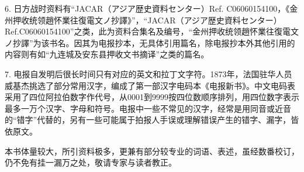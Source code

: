 \documentclass[12pt,UTF8]{ctexbook}
\begin{document}
6. 日方战时资料有“JACAR（アジア歴史資料センター）Ref. C06060154100，《金州押收统领趙怀業往復電文ノ抄譯》”，“JACAR（アジア歴史資料センター）Ref.C06060154100”之类，此为资料合集名及编号，“金州押收统领趙怀業往復電文ノ抄譯”为该书名。因其为电报抄本，无具体引用篇名，除电报抄本外其他引用的内容则有如“九连城及安东县押收文书摘译”之类的篇名。

7. 电报自发明后很长时间只有对应的英文和拉丁文字符。1873年，法国驻华人员威基杰挑选了部分常用汉字，编成了第一部汉字电码本《电报新书》。中文电码表采用了四位阿拉伯数字作代号，从0001到9999按四位数顺序排列，用四位数字表示最多一万个汉字、字母和符号。电报中一些不常见的汉字，经常是用同音或近音的“错字”代替的，另有一些可能属于拍报人手误或理解错误产生的错字、漏字，皆依原文。

本书体量较大，所引资料极多，更兼有部分较专业的词语、表述，虽经数番校订，仍不免有挂一漏万之处，敬请专家与读者教正。
\end{document}
